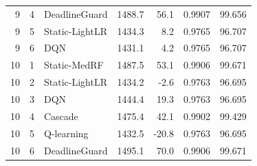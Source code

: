 \begin{longtable}{rrlrrrr}
9 & 4 & DeadlineGuard & 1488.7 & 56.1 & 0.9907 & 99.656\\
9 & 5 & Static-LightLR & 1434.3 & 8.2 & 0.9765 & 96.707\\
9 & 6 & DQN & 1431.1 & 4.2 & 0.9765 & 96.707\\
10 & 1 & Static-MedRF & 1487.5 & 53.1 & 0.9906 & 99.671\\
10 & 2 & Static-LightLR & 1434.2 & -2.6 & 0.9763 & 96.695\\
10 & 3 & DQN & 1444.4 & 19.3 & 0.9763 & 96.695\\
10 & 4 & Cascade & 1475.4 & 42.1 & 0.9902 & 99.429\\
10 & 5 & Q-learning & 1432.5 & -20.8 & 0.9763 & 96.695\\
10 & 6 & DeadlineGuard & 1495.1 & 70.0 & 0.9906 & 99.671\\
\end{longtable}\normalsize
